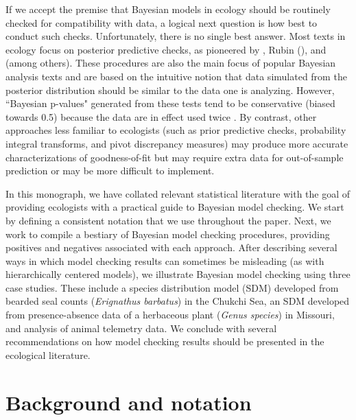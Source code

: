 \documentclass[12pt,english]{article}
\begin{document}
\begin{spacing}{1.9}
If we accept the premise that Bayesian models in ecology should be routinely checked for compatibility with data, a logical next question is how best to conduct such checks.  Unfortunately, there is no single best answer.  Most texts in ecology \citep[e.g.,][]{KingEtAl2009,LinkBarker2010,KerySchaub2012} focus on posterior predictive checks, as pioneered by \citet{Guttman1967}, Rubin (\citeyear{Rubin1981,Rubin1984}), and \citet{GelmanEtAl1996} (among others).  These procedures are also the main focus of popular Bayesian analysis texts \citep[e.g.,][]{CressieWikle2011,GelmanEtAl2014} and are based on the intuitive notion that data simulated from the posterior distribution should be similar to the data one is analyzing.  However, ``Bayesian p-values" generated from these tests tend to be conservative (biased towards 0.5) because the data are in effect used twice \citep[once to fit the model and once to test the model;][]{BayarriBerger2000,RobinsEtAl2000}.  By contrast, other approaches less familiar to ecologists (such as prior predictive checks, probability integral transforms, and pivot discrepancy measures) may produce more accurate characterizations of goodness-of-fit but may require extra data for out-of-sample prediction or may be more difficult to implement.

In this monograph, we have collated relevant statistical literature with the goal of providing ecologists with a practical guide to Bayesian model checking.  We start by defining a consistent notation that we use throughout the paper. Next, we work to compile a bestiary of Bayesian model checking procedures, providing positives and negatives associated with each approach.  After describing several ways in which model checking results can sometimes be misleading (as with hierarchically centered models), we illustrate Bayesian model checking using three case studies.  These include a species distribution model (SDM) developed from bearded seal counts (\textit{Erignathus barbatus}) in the Chukchi Sea, an SDM developed from presence-absence data of a herbaceous plant (\textit{Genus species}) in Missouri, and analysis of animal telemetry data.  We conclude with several recommendations on how model checking results should be presented in the ecological literature.



\section{Background and notation}


\end{spacing}
\end{document}
